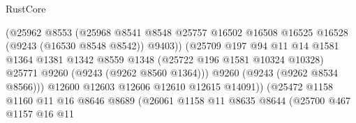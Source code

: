 \begin{lexlean}{RustCore}
\begin{coremodule}
                                          (@25962
                                            @8553
                                            (@25968
                                              @8541
                                              @8548
                                              @25757
                                              @16502
                                              @16508
                                              @16525
                                              @16528
                                              (@9243 (@16530 @8548 @8542))
                                              @9403))
                                          (@25709
                                            @197
                                            @94
                                            @11
                                            @14
                                            @1581
                                            @1364
                                            @1381
                                            @1342
                                            @8559
                                            @1348
                                            (@25722 @196 @1581 @10324 @10328)
                                            @25771
                                            @9260
                                            (@9243 (@9262 @8560 @1364)))
                                          @9260
                                          (@9243 (@9262 @8534 @8566)))
                                        @12600
                                        @12603
                                        @12606
                                        @12610
                                        @12615
                                        @14091))
                                    (@25472
                                      @1158
                                      @1160
                                      @11
                                      @16
                                      @8646
                                      @8689
                                      (@26061
                                        @1158
                                        @11
                                        @8635
                                        @8644
                                        (@25700
                                          @467
                                          @1157
                                          @16
                                          @11

\end{coremodule}
\end{lexlean}
